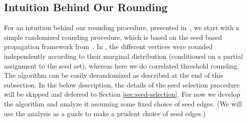 \documentclass{article}
\newcounter{alg-count}
\begin{document}
\subsection{Intuition Behind Our Rounding}
\label{sec:int}
For an intuition behind our rounding procedure, presented
in~, we start with a simple randomized rounding
procedure, which is based on the seed based propagation framework
from~\cite{gs11-qip}. In \cite{gs11-qip}, the different vertices were
rounded independently according to their marginal distribution
(conditioned on a partial assignment to the seed set), whereas here we
do correlated threshold rounding. The algorithm can be easily
derandomized as described at the end of this subsection. In the below
description, the details of the seed selection procedure will be
skipped and deferred to Section \ref{sec:seed-selection}. For now we
develop the algorithm and analyze it assuming some fixed choice of
seed edges.  (We will use the analysis as a guide to make a prudent
choice of seed edges.)

\vspace{0.1in}
\end{document}
